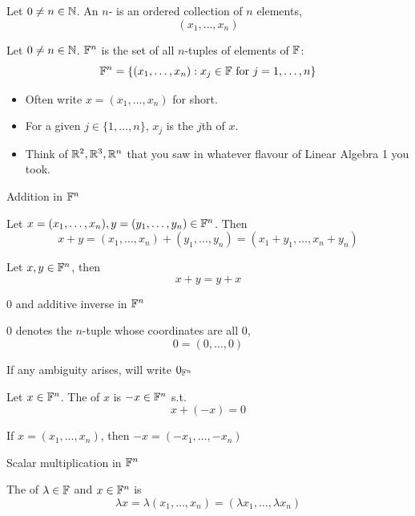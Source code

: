 \documentclass[aspectratio=169]{beamer}
\begin{document}
\begin{frame}
\begin{definition}
Let $0\neq n\in\mathbb{N}$. An $n$- is an ordered collection of $n$ elements,
\[
(x_1,\ldots,x_n)
\]
\end{definition}
\begin{definition}
Let $0\neq n\in\mathbb{N}$. $\IF^n$ is the set of all $n$-tuples of elements of $\mathbb{F}$:
\[
\mathbb{F}^n=\left\{
(x_1,\ldots,x_n): x_j\in\mathbb{F}\textrm{ for }j=1,\ldots,n
\right\}
\]
\end{definition}
\begin{itemize}
    \item Often write $x=(x_1,\ldots,x_n)$ for short.
    \item For a given $j\in\{1,\ldots,n\}$, $x_j$ is the $j$th  of $x$.
    \item Think of $\mathbb{R}^2,\mathbb{R}^3,\mathbb{R}^n$ that you saw in whatever flavour of Linear Algebra 1 you took.
\end{itemize}
\end{frame}


\begin{frame}{Addition in $\IF^n$}
\begin{definition}[Addition in $\IF^n$]
Let $x=(x_1,\ldots,x_n),y=(y_1,\ldots,y_n)\in\mathbb{F}^n$. Then
\[
x+y=(x_1,\ldots,x_n)+(y_1,\ldots,y_n)=(x_1+y_1,\ldots,x_n+y_n)
\]
\end{definition}
\vfill
\begin{property}
Let $x,y\in\mathbb{F}^n$, then
\[
x+y=y+x
\]
\end{property}
\end{frame}


\begin{frame}{$0$ and additive inverse in $\IF^n$}
\begin{definition}[$0$]
$0$ denotes the $n$-tuple whose coordinates are all 0,
\[
0=(0,\ldots,0)
\]
\end{definition}
If any ambiguity arises, will write $0_{\mathbb{F}^n}$
\vfill
\begin{definition}
Let $x\in\mathbb{F}^n$. The  of $x$ is $-x\in\mathbb{F}^n$ s.t.
\[
x+(-x)=0
\]
\end{definition}
If $x=(x_1,\ldots,x_n)$, then $-x=(-x_1,\ldots,-x_n)$
\end{frame}

\begin{frame}{Scalar multiplication in $\IF^n$}
\begin{definition}
The  of $\lambda\in\mathbb{F}$ and $x\in\mathbb{F}^n$ is
\[
\lambda x=\lambda(x_1,\ldots,x_n)=(\lambda x_1,\ldots,\lambda x_n)
\]
\end{definition}
\end{frame}
\end{document}
